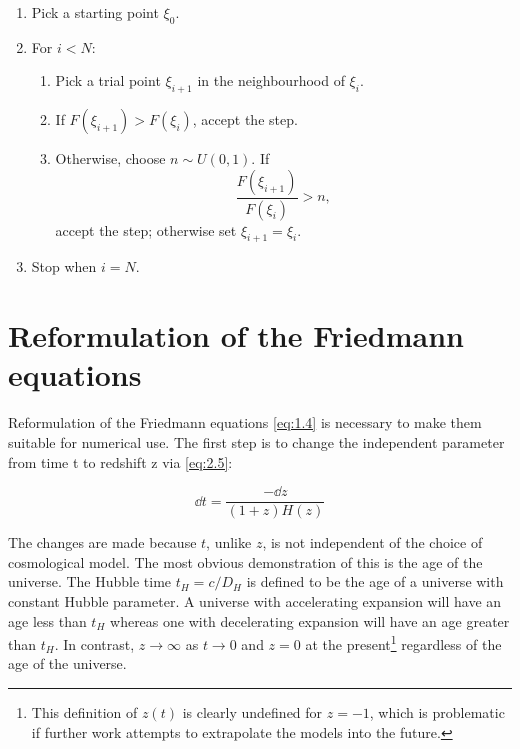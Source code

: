 \begin{algorithm}
\caption{Random walk algorithm}
\label{alg:2.1}

\begin{enumerate}
    \item Pick a starting point $\xi_0$.

    \item For $i < N$:
    \begin{enumerate}
        \item Pick a trial point $\xi_{i+1}$ in the neighbourhood of $\xi_i$.
        \item If $F(\xi_{i+1}) > F(\xi_i)$, accept the step.
        \item Otherwise, choose $n \sim U(0,1)$. If
        \[
            \frac{F(\xi_{i+1})}{F(\xi_i)} > n,
        \]
        accept the step; otherwise set $\xi_{i+1}=\xi_i$.
    \end{enumerate}

    \item Stop when $i=N$.
\end{enumerate}

\end{algorithm}

\section{Reformulation of the Friedmann equations}
\label{sec:2.4}

Reformulation of the Friedmann equations \cref{eq:1.4} is necessary to make them suitable for numerical use. The first step is to change the independent parameter from time t to redshift z via \cref{eq:2.5}:

\begin{equation}
    \dd{t} = \frac{-\dd{z}}{(1+z) H(z)}
\label{eq:2.5}
\end{equation}

The changes are made because $t$, unlike $z$, is not independent of the choice of cosmological model. The most obvious demonstration of this is the age of the universe. The Hubble time $t_H = c/D_H$ is defined to be the age of a universe with constant Hubble parameter. A universe with accelerating expansion will have an age less than $t_H$ whereas one with decelerating expansion will have an age greater than $t_H$. In contrast, $z \rightarrow{} \infty{}$ as $t \rightarrow{} 0$ and $z = 0$ at the present\footnote{This definition of $z(t)$ is clearly undefined for $z=-1$, which is problematic if further work attempts to extrapolate the models into the future.} regardless of the age of the universe. 

